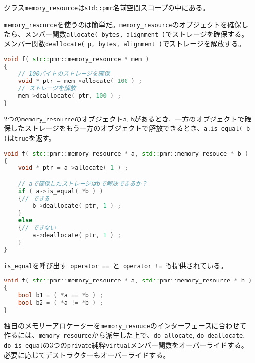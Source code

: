 クラス\lstinline!memory_resource!は\lstinline!std::pmr!名前空間スコープの中にある。

%

\lstinline!memory_resource!を使うのは簡単だ。\lstinline!memory_resource!のオブジェクトを確保したら、メンバー関数\lstinline!allocate( bytes, alignment )!でストレージを確保する。メンバー関数\lstinline!deallocate( p, bytes, alignment )!でストレージを解放する。

\begin{lstlisting}[language=C++]
void f( std::pmr::memory_resource * mem )
{
    // 100バイトのストレージを確保
    void * ptr = mem->allocate( 100 ) ;
    // ストレージを解放
    mem->deallocate( ptr, 100 ) ;
}
\end{lstlisting}

2つの\lstinline!memory_resource!のオブジェクト\lstinline!a!,
\lstinline!b!があるとき、一方のオブジェクトで確保したストレージをもう一方のオブジェクトで解放できるとき、\lstinline!a.is_equal( b )!は\lstinline!true!を返す。

\begin{lstlisting}[language=C++]
void f( std::pmr::memory_resource * a, std::pmr::memory_resouce * b )
{
    void * ptr = a->allocate( 1 ) ;

    // aで確保したストレージはbで解放できるか？
    if ( a->is_equal( *b ) )
    {// できる
        b->deallocate( ptr, 1 ) ;
    }
    else
    {// できない
        a->deallocate( ptr, 1 ) ;
    }
}
\end{lstlisting}

\lstinline!is_equal!を呼び出す~\lstinline!operator ==!~と~\lstinline"operator !="~も提供されている。

\begin{lstlisting}[language=C++]
void f( std::pmr::memory_resource * a, std::pmr::memory_resource * b )
{
    bool b1 = ( *a == *b ) ;
    bool b2 = ( *a != *b ) ;
}
\end{lstlisting}

%

独自のメモリーアロケーターを\lstinline!memory_resouce!のインターフェースに合わせて作るには、\lstinline!memory_resource!から派生した上で、\lstinline!do_allocate!,
\lstinline!do_deallocate!,
\lstinline!do_is_equal!の3つの\lstinline!private!純粋\lstinline!virtual!メンバー関数をオーバーライドする。必要に応じてデストラクターもオーバーライドする。

